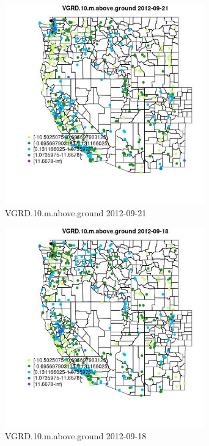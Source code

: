 \begin{figure} 
\centering  
\includegraphics[width=0.77\textwidth]{Code_Outputs/Report_ML_input_PM25_Step4_part_e_de_duplicated_aves_compiled_2019-05-14wNAs_MapObsVGRD10maboveground2012-09-21.jpg} 
\caption{\label{fig:Report_ML_input_PM25_Step4_part_e_de_duplicated_aves_compiled_2019-05-14wNAsMapObsVGRD10maboveground2012-09-21}VGRD.10.m.above.ground 2012-09-21} 
\end{figure} 
 

\begin{figure} 
\centering  
\includegraphics[width=0.77\textwidth]{Code_Outputs/Report_ML_input_PM25_Step4_part_e_de_duplicated_aves_compiled_2019-05-14wNAs_MapObsVGRD10maboveground2012-09-18.jpg} 
\caption{\label{fig:Report_ML_input_PM25_Step4_part_e_de_duplicated_aves_compiled_2019-05-14wNAsMapObsVGRD10maboveground2012-09-18}VGRD.10.m.above.ground 2012-09-18} 
\end{figure} 
 

